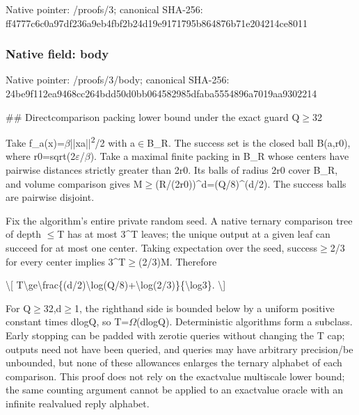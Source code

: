 \documentclass[10pt,a4paper]{article}
\begin{document}
Native pointer: /proofs/3; canonical SHA-256: ff4777c6c0a97df236a9eb4f\allowbreak{}bf2b24d19e9171795b864876\allowbreak{}b71e204214ce8011



\subsubsection{Native field: body}


Native pointer: /proofs/3/body; canonical SHA-256: 24be9f112ea9468cc264bdd5\allowbreak{}0d0bb064582985dfaba55548\allowbreak{}96a7019aa9302214


\#\# Directcomparison packing lower bound under the exact guard Q\ensuremath{\ge}32

Take f\_a(x)=\ensuremath{\beta}||xa||\textsuperscript{2}/2 with a\ensuremath{\in}B\_R. The success set is the closed ball B(a,r0), where r0=sqrt(2\ensuremath{\varepsilon}/\ensuremath{\beta}). Take a maximal finite packing in B\_R whose centers have pairwise distances strictly greater than 2r0. Its balls of radius 2r0 cover B\_R, and volume comparison gives M\ensuremath{\ge}(R/(2r0))\textasciicircum{}d=(Q/8)\textasciicircum{}(d/2). The success balls are pairwise disjoint.

Fix the algorithm’s entire private random seed. A native ternary comparison tree of depth \ensuremath{\le}T has at most 3\textasciicircum{}T leaves; the unique output at a given leaf can succeed for at most one center. Taking expectation over the seed, success\ensuremath{\ge}2/3 for every center implies 3\textasciicircum{}T\ensuremath{\ge}(2/3)M. Therefore

\textbackslash{}[
T\textbackslash{}ge\textbackslash{}frac\{(d/2)\textbackslash{}log(Q/8)\allowbreak{}+\textbackslash{}log(2/3)\}\{\textbackslash{}log3\}.
\textbackslash{}]

For Q\ensuremath{\ge}32,d\ensuremath{\ge}1, the righthand side is bounded below by a uniform positive constant times dlogQ, so T=\ensuremath{\Omega}(dlogQ). Deterministic algorithms form a subclass. Early stopping can be padded with zerotie queries without changing the T cap; outputs need not have been queried, and queries may have arbitrary precision/be unbounded, but none of these allowances enlarges the ternary alphabet of each comparison. This proof does not rely on the exactvalue multiscale lower bound; the same counting argument cannot be applied to an exactvalue oracle with an infinite realvalued reply alphabet.
\end{document}

